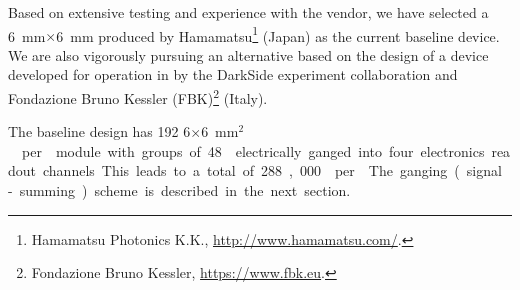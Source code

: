 Based on extensive testing and experience with the vendor, we have selected a \SI{6}{mm}$\times$\SI{6}{mm}  %
produced by Hamamatsu\footnote{Hamamatsu\texttrademark{} Photonics K.K., \url{http://www.hamamatsu.com/}.} (Japan) as the current baseline  device. %
We are also vigorously pursuing an alternative based on the design of a device developed for operation in \lar by the DarkSide experiment collaboration and Fondazione Bruno Kessler (FBK)\footnote{Fondazione Bruno Kessler\texttrademark{}, \url{https://www.fbk.eu}.} (Italy).

The baseline  design has 192 \num{6}$\times$\SI{6}{mm$^2$}  per  module with groups of 48  electrically ganged into four electronics readout channels. This leads to a total of 288,000  per . The ganging (signal-summing) scheme is described in the next section.



